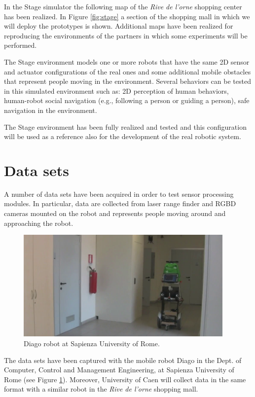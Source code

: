 \documentclass{article}
\begin{document}
In the Stage simulator the following map of the \emph{Rive de l'orne} shopping center has been realized. In Figure \ref{fig:stage} a section of the shopping mall in which we will deploy the prototypes is shown.
Additional maps have been realized for reproducing the environments of the partners in which some experiments will be performed.

The Stage environment models one or more robots that have the same 2D sensor and actuator configurations of the real ones and some additional mobile obstacles that represent people moving in the environment. Several behaviors can be tested in this simulated environment such as: 2D perception of human behaviors, human-robot social navigation (e.g., following a person or guiding a person), safe navigation in the environment.

The Stage environment has been fully realized and tested and this configuration will be used as a reference also for the development of the real robotic system.

\section{Data sets}

A number of data sets have been acquired in order to test sensor processing modules. In particular, data are collected from laser range finder and RGBD cameras mounted on the robot and represents people moving around and approaching the robot.

\begin{figure}
\includegraphics[width=0.95\textwidth]{diago.png}
\caption{Diago robot at Sapienza University of Rome.}
\label{fig:diago}
\end{figure}


The data sets have been captured with the mobile robot Diago in the Dept. of Computer, Control and Management Engineering, at Sapienza University of Rome (see Figure \ref{fig:diago}). Moreover, University of Caen will collect data in the same format with a similar robot in the \emph{Rive de l'orne} shopping mall.
\end{document}
